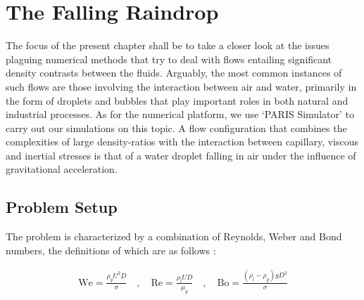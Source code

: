 \setchapterpreamble[u]{\margintoc}
\chapter{The Falling Raindrop}

The focus of the present chapter shall be to take a closer look at the issues 
plaguing numerical methods that try to deal with flows 
entailing significant density contrasts between the fluids. 
Arguably, the most common instances of such flows are those involving the interaction
between air and water, primarily in the form of droplets and 
bubbles that play important roles in both natural and industrial processes. 
As for the numerical platform, we use `PARIS Simulator' 
to carry out our simulations on this topic. 
A flow configuration that combines the complexities of large 
density-ratios with the interaction between capillary, viscous and 
inertial stresses is that of a water droplet falling in 
air under the influence of gravitational acceleration.

\section{Problem Setup}

The problem is characterized by a combination of Reynolds, 
Weber and Bond numbers, the definitions of which are as follows : 

\begin{align}
	\textrm{We}=\frac{\rho_{g} U^2 D}{\sigma} \quad,\quad \textrm{Re}= \frac{\rho_{l} U D}{\mu_{g}} \quad,\quad \textrm{Bo}=\frac{\left(\rho_{l}-\rho_{g}\right) g D^2 }{\sigma}
\end{align}



